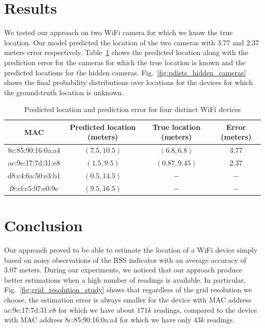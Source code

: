 \documentclass{article}
\begin{document}
\section{Results}
\vspace{-.3cm}
We tested our approach on two WiFi camera for which we know the true location. Our
model predicted the location of the two cameras with $3.77$ and $2.37$ meters error respectively.
Table~\ref{tab:results} shows the predicted location along with the prediction error for the
cameras for which the true location is known and the predicted locations for the hidden cameras.
Fig.~\ref{fig:pdists_hidden_cameras} shows the final probability distributions over locations for the
devices for which the ground-truth location is unknown.

\begin{table}[h]
\centering
\begin{tabular}{ |c|c|c|c| }
 \hline
 MAC & Predicted location (meters) & True location (meters) & Error (meters) \\ 
 \hline
 8c:85:90:16:0a:a4 & $(7.5, 10.5)$ & $(6.8, 6.8)$ & $3.77$\\ 
 ac:9e:17:7d:31:e8 & $(1.5, 9.5)$ & $(0.87, 9.45)$ & $2.37$ \\ 
 d8:c4:6a:50:e3:b1 & $(0.5, 14.5)$ & $-$ & $-$ \\
 f8:cf:c5:97:e0:9e & $(9.5, 16.5)$ & $-$ & $-$ \\
 \hline
\end{tabular}
 \caption{Predicted location and prediction error for four distinct WiFi devices \label{tab:results}}
\end{table}


\section{Conclusion}
\vspace{-.3cm}
Our approach proved to be able to estimate the location of a WiFi device simply based on
noisy observations of the RSS indicator with an average accuracy of $3.07$ meters.
During our experiments, we noticed that our approach produce better estimations when 
a high number of readings is available. In particular, Fig.~\ref{fig:grid_resolution_study} shows
that regardless of the grid resolution we choose, 
the estimation error is always smaller for the device with MAC address ac:9e:17:7d:31:e8
for which we have about $171k$ readings, compared to the device with MAC address
8c:85:90:16:0a:a4 for which we have only $43k$ readings.


{\scriptsize%

}
\end{document}
